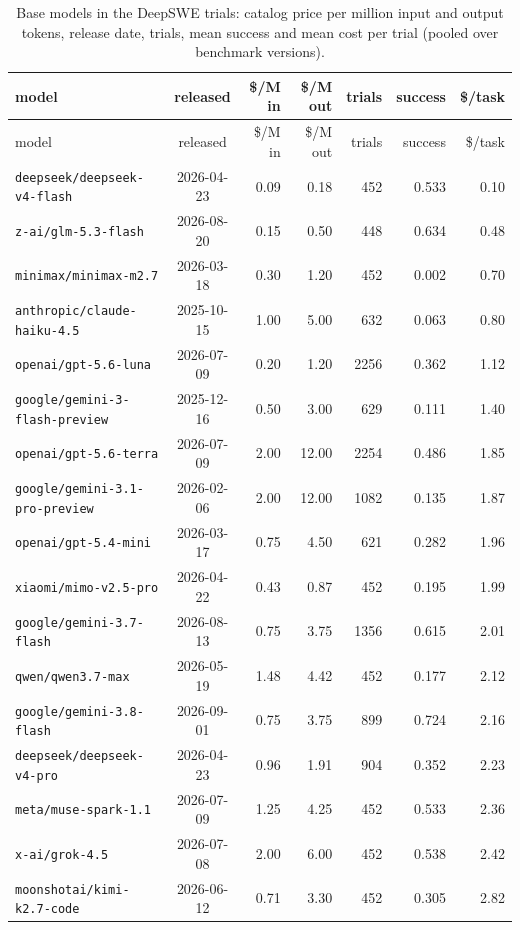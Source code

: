 \begin{longtable}{lcrrrrr}\caption{Base models in the DeepSWE trials: catalog price per million input and output tokens, release date, trials, mean success and mean cost per trial (pooled over benchmark versions).}\label{tab:allmodels}\\\toprule
model & released & \$/M in & \$/M out & trials & success & \$/task\\\midrule\endfirsthead
\toprule
model & released & \$/M in & \$/M out & trials & success & \$/task\\\midrule\endhead
\texttt{deepseek/deepseek-v4-flash} & 2026-04-23 & 0.09 & 0.18 & 452 & 0.533 & 0.10\\
\texttt{z-ai/glm-5.3-flash} & 2026-08-20 & 0.15 & 0.50 & 448 & 0.634 & 0.48\\
\texttt{minimax/minimax-m2.7} & 2026-03-18 & 0.30 & 1.20 & 452 & 0.002 & 0.70\\
\texttt{anthropic/claude-haiku-4.5} & 2025-10-15 & 1.00 & 5.00 & 632 & 0.063 & 0.80\\
\texttt{openai/gpt-5.6-luna} & 2026-07-09 & 0.20 & 1.20 & 2256 & 0.362 & 1.12\\
\texttt{google/gemini-3-flash-preview} & 2025-12-16 & 0.50 & 3.00 & 629 & 0.111 & 1.40\\
\texttt{openai/gpt-5.6-terra} & 2026-07-09 & 2.00 & 12.00 & 2254 & 0.486 & 1.85\\
\texttt{google/gemini-3.1-pro-preview} & 2026-02-06 & 2.00 & 12.00 & 1082 & 0.135 & 1.87\\
\texttt{openai/gpt-5.4-mini} & 2026-03-17 & 0.75 & 4.50 & 621 & 0.282 & 1.96\\
\texttt{xiaomi/mimo-v2.5-pro} & 2026-04-22 & 0.43 & 0.87 & 452 & 0.195 & 1.99\\
\texttt{google/gemini-3.7-flash} & 2026-08-13 & 0.75 & 3.75 & 1356 & 0.615 & 2.01\\
\texttt{qwen/qwen3.7-max} & 2026-05-19 & 1.48 & 4.42 & 452 & 0.177 & 2.12\\
\texttt{google/gemini-3.8-flash} & 2026-09-01 & 0.75 & 3.75 & 899 & 0.724 & 2.16\\
\texttt{deepseek/deepseek-v4-pro} & 2026-04-23 & 0.96 & 1.91 & 904 & 0.352 & 2.23\\
\texttt{meta/muse-spark-1.1} & 2026-07-09 & 1.25 & 4.25 & 452 & 0.533 & 2.36\\
\texttt{x-ai/grok-4.5} & 2026-07-08 & 2.00 & 6.00 & 452 & 0.538 & 2.42\\
\texttt{moonshotai/kimi-k2.7-code} & 2026-06-12 & 0.71 & 3.30 & 452 & 0.305 & 2.82\\

\end{longtable}
